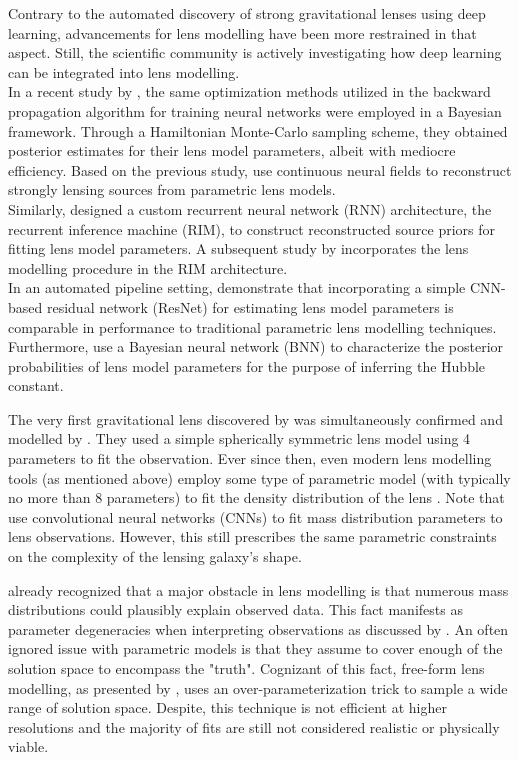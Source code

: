 \documentclass[a4paper,10pt]{article}
\begin{document}
Contrary to the automated discovery of strong gravitational lenses
using deep learning, advancements for lens modelling have been more
restrained in that aspect. Still, the scientific community is actively
investigating how deep learning can be integrated into lens
modelling. \\[0pt]
In a recent study by \cite{Gu22}, the same optimization methods
utilized in the backward propagation algorithm for training neural
networks were employed in a Bayesian framework. Through a Hamiltonian
Monte-Carlo sampling scheme, they obtained posterior estimates for
their lens model parameters, albeit with mediocre efficiency. Based on
the previous study, \cite{Mishra-Sharma22} use continuous neural
fields to reconstruct strongly lensing sources from parametric lens
models. \\[0pt]
Similarly, \cite{Morningstar19} designed a custom recurrent neural
network (RNN) architecture, the recurrent inference machine (RIM), to
construct reconstructed source priors for fitting lens model
parameters. A subsequent study by \cite{Adam22} incorporates the
lens modelling procedure in the RIM architecture. \\[0pt]
In an automated pipeline setting, \cite{Schuldt22,Chianese19}
demonstrate that incorporating a simple CNN-based residual network
(ResNet) for estimating lens model parameters is comparable in
performance to traditional parametric lens modelling techniques. \\[0pt]
Furthermore, \cite{Park20} use a Bayesian neural network (BNN) to
characterize the posterior probabilities of lens model parameters for
the purpose of inferring the Hubble constant.

The very first gravitational lens discovered by \cite{Walsh79} was
simultaneously confirmed and modelled by \cite{Young80}. They used
a simple spherically symmetric lens model using 4 parameters to fit
the observation. Ever since then, even modern lens modelling tools (as
mentioned above) employ some type of parametric model (with typically
no more than 8 parameters) to fit the density distribution of the lens
\citep[cf.][]{Birrer18,Hezaveh17,Tessore16,Oguri10}. Note that
\cite{Hezaveh17} use convolutional neural networks (CNNs) to fit
mass distribution parameters to lens observations. However, this still
prescribes the same parametric constraints on the complexity of the
lensing galaxy's shape.

\cite{Young81} already recognized that a major obstacle in lens
modelling is that numerous mass distributions could plausibly explain
observed data. This fact manifests as parameter degeneracies when
interpreting observations as discussed by
\cite{Saha00,Saha06,Schneider14,Birrer21}.  An often ignored issue
with parametric models is that they assume to cover enough of the
solution space to encompass the "truth".  Cognizant of this fact,
free-form lens modelling, as presented by \citep{Saha04}, uses an
over-parameterization trick to sample a wide range of solution
space. Despite, this technique is not efficient at higher resolutions
and the majority of fits are still not considered realistic or
physically viable.
\end{document}
